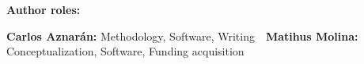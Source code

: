 \begin{framed}
    \def\roleconceptualization{Conceptualization}
    \def\rolemethodology{Methodology}
    \def\rolesoftware{Software}
    \def\rolewriting{Writing}
    \def\rolefunding{Funding acquisition}

    \textbf{Author roles:}\vspace{-2ex}
    \begin{flushleft}
        \textbf{Carlos Aznarán:} \rolemethodology, \rolesoftware, \rolewriting \ \
        \textbf{Matihus Molina:} \roleconceptualization, \rolesoftware, \rolefunding \
    \end{flushleft}
\end{framed}
